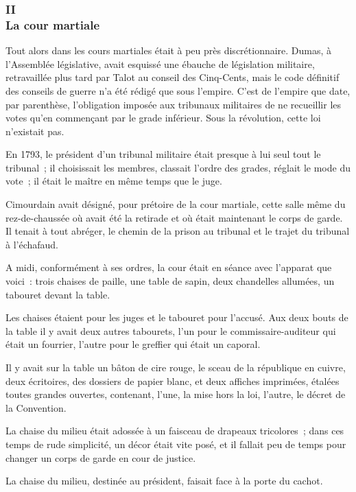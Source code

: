 \documentclass[french,twoside]{book} %
\begin{document}
 \subsubsection[{II. La cour martiale}]{II \\
La cour martiale}
\label{p3l7c2}
\noindent Tout alors dans les cours martiales était à peu près discrétionnaire. Dumas, à l’Assemblée législative, avait esquissé une ébauche de législation militaire, retravaillée plus tard par Talot au conseil des Cinq-Cents, mais le code définitif des conseils de guerre n’a été rédigé que sous l’empire. C’est de l’empire que date, par parenthèse, l’obligation imposée aux tribunaux militaires de ne recueillir les votes qu’en commençant par le grade inférieur. Sous la révolution, cette loi n’existait pas.\par
En 1793, le président d’un tribunal militaire était presque à lui seul tout le tribunal ; il choisissait les membres, classait l’ordre des grades, réglait le mode du vote ; il était le maître en même temps que le juge.\par
Cimourdain avait désigné, pour prétoire de la cour martiale, cette salle même du rez-de-chaussée où avait été la retirade et où était maintenant le corps de garde. Il tenait à tout abréger, le chemin de la prison au tribunal et le trajet du tribunal à l’échafaud.\par
A midi, conformément à ses ordres, la cour était en séance avec l’apparat que voici : trois chaises de  paille, une table de sapin, deux chandelles allumées, un tabouret devant la table.\par
Les chaises étaient pour les juges et le tabouret pour l’accusé. Aux deux bouts de la table il y avait deux autres tabourets, l’un pour le commissaire-auditeur qui était un fourrier, l’autre pour le greffier qui était un caporal.\par
Il y avait sur la table un bâton de cire rouge, le sceau de la république en cuivre, deux écritoires, des dossiers de papier blanc, et deux affiches imprimées, étalées toutes grandes ouvertes, contenant, l’une, la mise hors la loi, l’autre, le décret de la Convention.\par
La chaise du milieu était adossée à un faisceau de drapeaux tricolores ; dans ces temps de rude simplicité, un décor était vite posé, et il fallait peu de temps pour changer un corps de garde en cour de justice.\par
La chaise du milieu, destinée au président, faisait face à la porte du cachot.\par
\end{document}
